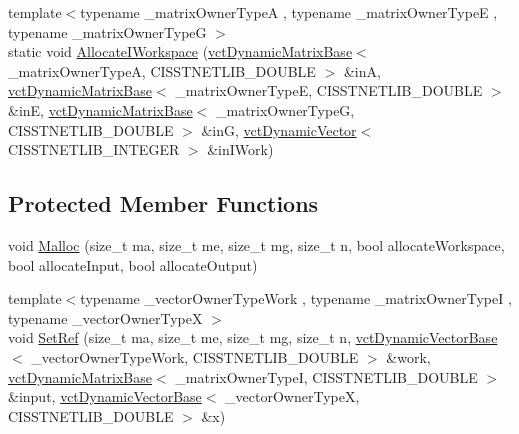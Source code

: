 \begin{DoxyCompactItemize}
\item 
{\footnotesize template$<$typename \-\_\-matrix\-Owner\-Type\-A , typename \-\_\-matrix\-Owner\-Type\-E , typename \-\_\-matrix\-Owner\-Type\-G $>$ }\\static void \hyperlink{classnmr_l_sq_lin_solution_dynamic_a2fbcdc13d936509207e989ad379a65cc}{Allocate\-I\-Workspace} (\hyperlink{classvct_dynamic_matrix_base}{vct\-Dynamic\-Matrix\-Base}$<$ \-\_\-matrix\-Owner\-Type\-A, C\-I\-S\-S\-T\-N\-E\-T\-L\-I\-B\-\_\-\-D\-O\-U\-B\-L\-E $>$ \&in\-A, \hyperlink{classvct_dynamic_matrix_base}{vct\-Dynamic\-Matrix\-Base}$<$ \-\_\-matrix\-Owner\-Type\-E, C\-I\-S\-S\-T\-N\-E\-T\-L\-I\-B\-\_\-\-D\-O\-U\-B\-L\-E $>$ \&in\-E, \hyperlink{classvct_dynamic_matrix_base}{vct\-Dynamic\-Matrix\-Base}$<$ \-\_\-matrix\-Owner\-Type\-G, C\-I\-S\-S\-T\-N\-E\-T\-L\-I\-B\-\_\-\-D\-O\-U\-B\-L\-E $>$ \&in\-G, \hyperlink{classvct_dynamic_vector}{vct\-Dynamic\-Vector}$<$ C\-I\-S\-S\-T\-N\-E\-T\-L\-I\-B\-\_\-\-I\-N\-T\-E\-G\-E\-R $>$ \&in\-I\-Work)
\end{DoxyCompactItemize}
\subsection*{Protected Member Functions}
\begin{DoxyCompactItemize}
\item 
void \hyperlink{classnmr_l_sq_lin_solution_dynamic_ace28a039675226d24fc6f406b64939c3}{Malloc} (size\-\_\-t ma, size\-\_\-t me, size\-\_\-t mg, size\-\_\-t n, bool allocate\-Workspace, bool allocate\-Input, bool allocate\-Output)
\item 
{\footnotesize template$<$typename \-\_\-vector\-Owner\-Type\-Work , typename \-\_\-matrix\-Owner\-Type\-I , typename \-\_\-vector\-Owner\-Type\-X $>$ }\\void \hyperlink{classnmr_l_sq_lin_solution_dynamic_a9246cf8d9711bb09223ce91ab8fa682e}{Set\-Ref} (size\-\_\-t ma, size\-\_\-t me, size\-\_\-t mg, size\-\_\-t n, \hyperlink{classvct_dynamic_vector_base}{vct\-Dynamic\-Vector\-Base}$<$ \-\_\-vector\-Owner\-Type\-Work, C\-I\-S\-S\-T\-N\-E\-T\-L\-I\-B\-\_\-\-D\-O\-U\-B\-L\-E $>$ \&work, \hyperlink{classvct_dynamic_matrix_base}{vct\-Dynamic\-Matrix\-Base}$<$ \-\_\-matrix\-Owner\-Type\-I, C\-I\-S\-S\-T\-N\-E\-T\-L\-I\-B\-\_\-\-D\-O\-U\-B\-L\-E $>$ \&input, \hyperlink{classvct_dynamic_vector_base}{vct\-Dynamic\-Vector\-Base}$<$ \-\_\-vector\-Owner\-Type\-X, C\-I\-S\-S\-T\-N\-E\-T\-L\-I\-B\-\_\-\-D\-O\-U\-B\-L\-E $>$ \&x)
\end{DoxyCompactItemize}
